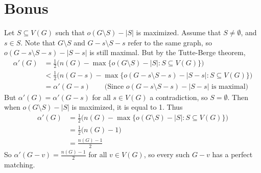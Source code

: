 \documentclass[11pt]{article}
\begin{document}
\section{Bonus} %
Let $S\subseteq V(G)$ such that $o(G\setminus S)-|S|$ is maximized. Assume that
$S\neq\emptyset$, and $s\in S$. Note that $G\setminus S$ and $G-s\setminus S-s$
refer to the same graph, so $o(G-s\setminus S-s)-|S-s|$ is still maximal. But
by the Tutte-Berge theorem,
\begin{align*}
	\alpha'(G)&=\frac{1}{2}\bigl(n(G)-\max\{o(G\setminus S)-|S|:S\subseteq V(G)\}\bigr)\\
	&<\frac{1}{2}\bigl(n(G-s)-\max\{o(G-s\setminus S-s)-|S-s|:S\subseteq V(G)\}\bigr)\\
	&=\alpha'(G-s)\qquad\text{(Since $o(G-s\setminus S-s)-|S-s|$ is maximal)}
\end{align*}
But $\alpha'(G)=\alpha'(G-s)$ for all $s\in V(G)$ a contradiction, so
$S=\emptyset$. Then when $o(G\setminus S)-|S|$ is maximized, it is equal to 1.
Thus
\begin{align*}
	\alpha'(G)&=\frac{1}{2}\bigl(n(G)-\max\{o(G\setminus S)-|S|:S\subseteq V(G)\}\bigr)\\
	&=\frac{1}{2}\bigl(n(G)-1\bigr)\\
	&=\frac{n(G)-1}{2}
\end{align*}
So $\alpha'(G-v)=\frac{n(G)-1}{2}$ for all $v\in V(G)$, so every such $G-v$ has
a perfect matching.
\end{document}
